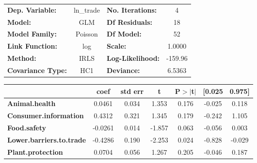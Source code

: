 \begin{center}
\begin{tabular}{lclc}
\toprule
\textbf{Dep. Variable:}                                            &   ln\_trade   & \textbf{  No. Iterations:    } &     4       \\
\textbf{Model:}                                                    &      GLM      & \textbf{  Df Residuals:      } &     18      \\
\textbf{Model Family:}                                             &    Poisson    & \textbf{  Df Model:          } &     52      \\
\textbf{Link Function:}                                            &      log      & \textbf{  Scale:             } &    1.0000   \\
\textbf{Method:}                                                   &      IRLS     & \textbf{  Log-Likelihood:    } &   -159.96   \\
\textbf{Covariance Type:}                                          &      HC1      & \textbf{  Deviance:          } &    6.5363   \\
\bottomrule
\end{tabular}
\begin{tabular}{lcccccc}
                                                                   & \textbf{coef} & \textbf{std err} & \textbf{t} & \textbf{P$> |$t$|$} & \textbf{[0.025} & \textbf{0.975]}  \\
\midrule
\textbf{Animal.health}                                             &       0.0461  &        0.034     &     1.353  &         0.176        &       -0.025    &        0.118     \\
\textbf{Consumer.information}                                      &       0.4312  &        0.321     &     1.345  &         0.179        &       -0.242    &        1.105     \\
\textbf{Food.safety}                                               &      -0.0261  &        0.014     &    -1.857  &         0.063        &       -0.056    &        0.003     \\
\textbf{Lower.barriers.to.trade}                                   &      -0.4286  &        0.190     &    -2.253  &         0.024        &       -0.828    &       -0.029     \\
\textbf{Plant.protection}                                          &       0.0704  &        0.056     &     1.267  &         0.205        &       -0.046    &        0.187     \\

\end{tabular}
\end{center}
